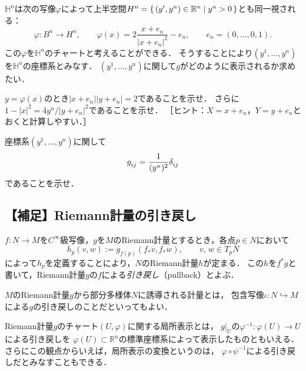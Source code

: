 \documentclass[uplatex,dvipdfmx,fontsize=12pt,jafontsize=11pt,line_length=42zw,number_of_lines=36,hanging_punctuation]{jlreq}
\newcommand{\abs}[1]{\lvert#1\rvert}
\newcommand{\compose}{\mathbin{\circ}}
\begin{document}
\begin{problems}
		$\mathbb{H}^n$は次の写像$\varphi$によって上半空間$H^n=\set{(y',y^n)\in\mathbb{R}^n|y^n>0}$とも同一視される：
		\begin{equation}
			\varphi\colon B^n\to H^n,\qquad
			\varphi(x)=2\frac{x+e_n}{\abs{x+e_n}^2}-e_n,\qquad
			e_n=(0,\dots,0,1).
		\end{equation}
		この$\varphi$を$\mathbb{H}^n$のチャートと考えることができる．
		そうすることにより$(y^1,\dots,y^n)$を$\mathbb{H}^n$の座標系とみなす．
		$(y^1,\dots,y^n)$に関して$g$がどのように表示されるか求めたい．
		\begin{subproblems}
			\item
				$y=\varphi(x)$のとき$\abs{x+e_n}\abs{y+e_n}=2$であることを示せ．
				さらに$1-\abs{x}^2=4y^n/\abs{y+e_n}^2$であることを示せ．
				［ヒント：$X=x+e_n$，$Y=y+e_n$とおくと計算しやすい．］
			\item
				座標系$(y^1,\dots,y^n)$に関して
				\begin{equation}
					\tensor{g}{_i_j}=\frac{1}{(y^n)^2}\tensor{\delta}{_i_j}
				\end{equation}
				であることを示せ．
		\end{subproblems}
\end{problems}

\subsection*{【補足】Riemann計量の引き戻し}

$f\colon N\to M$を$C^\infty$級写像，$g$を$M$のRiemann計量とするとき，各点$p\in N$において
\begin{equation}
	h_p(v,w):=g_{f(p)}(f_*v,f_*w),
	\qquad v,\,w\in T_pN
\end{equation}
によって$h_p$を定義することにより，$N$のRiemann計量$h$が定まる．
この$h$を$f^*g$と書いて，Riemann計量$g$の$f$による\emph{引き戻し}（pullback）とよぶ．

\begin{ex}
	$M$のRiemann計量$g$から部分多様体$N$に誘導される計量とは，
	包含写像$\iota\colon N\hookrightarrow M$による$g$の引き戻しのことだといってもよい．
\end{ex}

\begin{ex}
	Riemann計量$g$のチャート$(U,\varphi)$に関する局所表示とは，
	$g|_U$の$\varphi^{-1}\colon \varphi(U)\to U$による引き戻しを
	$\varphi(U)\subset\mathbb{R}^n$の標準座標系によって表示したものともいえる．
	さらにこの観点からいえば，局所表示の変換というのは，
	$\varphi\compose\psi^{-1}$による引き戻しだとみなすこともできる．
\end{ex}
\end{document}
